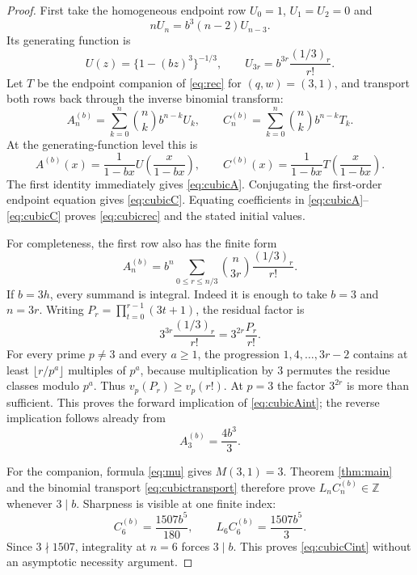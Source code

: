 \documentclass[11pt]{article}
\theoremstyle{remark}
\newcommand{\Z}{\mathbb Z}
\begin{document}
\begin{proof}
First take the homogeneous endpoint row $U_0=1$, $U_1=U_2=0$ and
\[
 nU_n=b^3(n-2)U_{n-3}.
\]
Its generating function is
\begin{equation}\label{eq:cubicU}
 U(z)=\{1-(bz)^3\}^{-1/3},
 \qquad
 U_{3r}=b^{3r}\frac{(1/3)_r}{r!}.
\end{equation}
Let $T$ be the endpoint companion of \eqref{eq:rec} for $(q,w)=(3,1)$,
and transport both rows back through the inverse binomial transform:
\begin{equation}\label{eq:cubictransport}
 A^{(b)}_n=\sum_{k=0}^n\binom nkb^{n-k}U_k,
 \qquad
 C^{(b)}_n=\sum_{k=0}^n\binom nkb^{n-k}T_k.
\end{equation}
At the generating-function level this is
\[
 A^{(b)}(x)=\frac1{1-bx}U\!\left(\frac{x}{1-bx}\right),
 \qquad
 C^{(b)}(x)=\frac1{1-bx}T\!\left(\frac{x}{1-bx}\right).
\]
The first identity immediately gives \eqref{eq:cubicA}.  Conjugating the
first-order endpoint equation gives \eqref{eq:cubicC}.  Equating
coefficients in \eqref{eq:cubicA}--\eqref{eq:cubicC} proves
\eqref{eq:cubicrec} and the stated initial values.

For completeness, the first row also has the finite form
\begin{equation}\label{eq:cubicAfin}
 A^{(b)}_n=b^n\sum_{0\le r\le n/3}
  \binom n{3r}\frac{(1/3)_r}{r!}.
\end{equation}
If $b=3h$, every summand is integral.  Indeed it is enough to take $b=3$
and $n=3r$.  Writing $P_r=\prod_{t=0}^{r-1}(3t+1)$, the residual factor is
\[
 3^{3r}\frac{(1/3)_r}{r!}=3^{2r}\frac{P_r}{r!}.
\]
For every prime $p\ne3$ and every $a\ge1$, the progression
$1,4,\ldots,3r-2$ contains at least $\lfloor r/p^a\rfloor$ multiples of
$p^a$, because multiplication by $3$ permutes the residue classes modulo
$p^a$.  Thus $v_p(P_r)\ge v_p(r!)$.  At $p=3$ the factor $3^{2r}$ is more
than sufficient.  This proves the forward implication of
\eqref{eq:cubicAint}; the reverse implication follows already from
\[
 A^{(b)}_3=\frac{4b^3}{3}.
\]

For the companion, formula \eqref{eq:mu} gives $M(3,1)=3$.  Theorem
\ref{thm:main} and the binomial transport \eqref{eq:cubictransport} therefore
prove $L_nC^{(b)}_n\in\Z$ whenever $3\mid b$.  Sharpness is visible at one
finite index:
\begin{equation}\label{eq:cubicwitness}
 C^{(b)}_6=\frac{1507b^5}{180},
 \qquad
 L_6C^{(b)}_6=\frac{1507b^5}{3}.
\end{equation}
Since $3\nmid1507$, integrality at $n=6$ forces $3\mid b$.  This proves
\eqref{eq:cubicCint} without an asymptotic necessity argument.


\end{proof}
\end{document}
